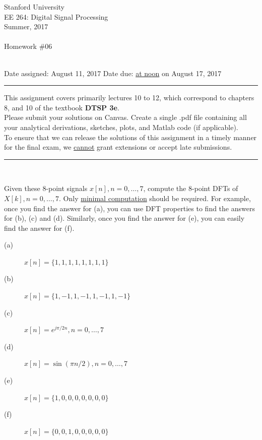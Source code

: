 \documentclass[12pt]{report}
\begin{document}
\thispagestyle{empty}
\begin{centering}
	{\large Stanford University}\\
	{\large EE 264: Digital Signal Processing}\\
	{\large Summer, 2017} \\
	\mbox{}\\
	{\large Homework \#06}\\
	\mbox{}\\
\end{centering}
\noindent Date assigned:  August 11, 2017 \hfill
Date due: \underline{at noon} on August 17, 2017\\
\noindent \rule{6.5 in}{0.5pt}
  This assignment covers primarily lectures 10 to 12, which correspond to chapters 8, and 10 of the textbook {\bf DTSP 3e}. \\
  Please submit your solutions on Canvas. Create a single .pdf file containing all your analytical derivations, sketches, plots, and Matlab code (if applicable). \\
  To ensure that we can release the solutions of this assignment in a timely manner for the final exam, we \underline{cannot} grant extensions or accept late submissions.

\noindent
\rule{6.5 in}{0.5pt}
\mbox{}\\


Given these 8-point signals $x[n], n = 0, \ldots, 7$, compute the 8-point DFTs of $X[k], n = 0, \ldots, 7$. Only \underline{minimal computation} should be required. For example, once you find the answer for (a), you can use DFT properties to find the answers for (b), (c) and (d). Similarly, once you find the answer for (e), you can easily find the answer for (f).

\begin{description}
	\item [(a)] $x[n] = \{1, 1, 1, 1, 1, 1, 1, 1\}$
	\item [(b)] $x[n] = \{1, -1, 1, -1, 1, -1, 1, -1\}$
	\item [(c)] $x[n] = e^{j\pi/2 n}, n = 0, \ldots, 7$
	\item [(d)] $x[n] = \sin(\pi n/2), n = 0, \ldots, 7$
	\item [(e)] $x[n] = \{1, 0, 0, 0, 0, 0, 0, 0\}$
	\item [(f)] $x[n] = \{0, 0, 1, 0, 0, 0, 0, 0\}$
\end{description}
\end{document}
